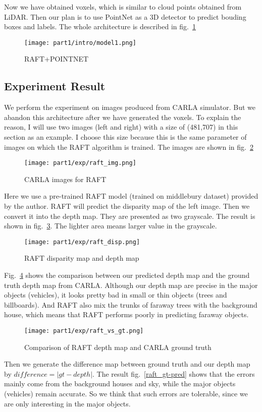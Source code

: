 \documentclass[12pt]{article}
\begin{document}
Now we have obtained voxels, which is similar to cloud points obtained from LiDAR. Then our plan is to use PointNet as a 3D detector to predict bouding boxes and labels. The whole architecture is described in fig.~\ref{model1}
\begin{figure}[H]
    \centering
    \texttt{[image: part1/intro/model1.png]}
    \caption{RAFT+POINTNET}
    \label{model1}
\end{figure}
\subsection{Experiment Result}
We perform the experiment on images produced from CARLA simulator. But we abandon this architecture after we have generated the voxels. To explain the reason, I will use two images (left and right) with a size of (481,707) in this section as an example. I choose this size because this is the same parameter of images on which the RAFT algorithm is trained. The images are shown in fig.~\ref{raft_img}
\begin{figure}[H]
    \centering
    \texttt{[image: part1/exp/raft\_img.png]}
    \caption{CARLA images for RAFT}
    \label{raft_img}
\end{figure}
Here we use a pre-trained RAFT model (trained on middlebury dataset) provided by the author. RAFT will predict the disparity map of the left image. Then we convert it into the depth map. They are presented as two grayscale. The result is shown in fig.~\ref{raft_disp}. The lighter area means larger value in the grayscale.
\begin{figure}[H]
    \centering
    \texttt{[image: part1/exp/raft\_disp.png]}
    \caption{RAFT disparity map and depth map}
    \label{raft_disp}
\end{figure}
Fig.~\ref{raft_depth_gt} shows the comparison between our predicted depth map and the ground truth depth map from CARLA. Although our depth map are precise in the major objects (vehicles), it looks pretty bad in small or thin objects (trees and billboards). And RAFT also mix the trunks of faraway trees with the background house, which means that RAFT performs poorly in predicting faraway objects.
\begin{figure}[H]
    \centering
    \texttt{[image: part1/exp/raft\_vs\_gt.png]}
    \caption{Comparison of RAFT depth map and CARLA ground truth}
    \label{raft_depth_gt}
\end{figure}
Then we generate the difference map between ground truth and our depth map by $difference = |gt-depth|$. The result fig.~\ref{raft_gt-pred} shows that the errors mainly come from the background houses and sky, while the major objects (vehicles) remain accurate. So we think that such errors are tolerable, since we are only interesting in the major objects.
\end{document}
